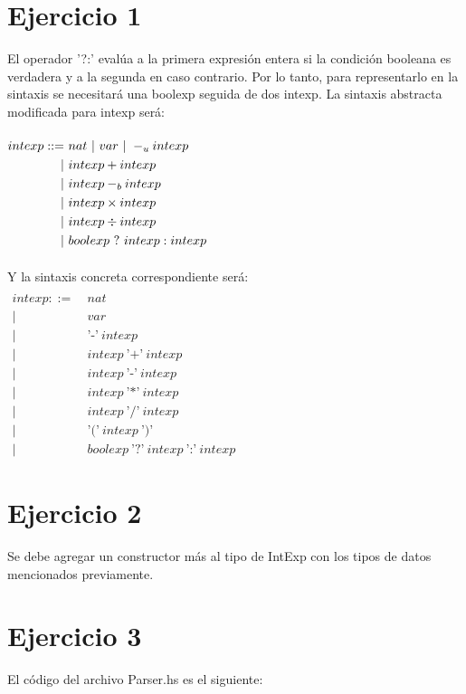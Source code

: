 \documentclass{article}
\begin{document}
	\section*{Ejercicio 1}
	El operador '?:' evalúa a la primera expresión entera si la condición booleana es verdadera
	y a la segunda en caso contrario. Por lo tanto, para representarlo en la sintaxis se necesitará 
	una boolexp seguida de dos intexp. La sintaxis abstracta modificada para intexp será: \\
\\
	$\begin{aligned}
		intexp ::=\ &nat\ |\ var\ |\ -_{u} intexp\\
		|\ &intexp + intexp\\
		|\ &intexp -_{b} intexp\\
		|\ &intexp \times intexp\\
		|\ &intexp \div intexp\\
		|\ &boolexp\ ?\ intexp : intexp
	\end{aligned}\\$
\\
\\
	Y la sintaxis concreta correspondiente será:\\
	$\begin{aligned}
\\	intexp ::=\ &nat\\
	|\ &var\\
	|\ &\text{'-'}\ intexp\\
	|\ &intexp\ \text{'+'}\ intexp\\
	|\ &intexp\ \text{'-'}\ intexp\\
	|\ &intexp\ \text{'*'}\ intexp\\
	|\ &intexp\ \text{'/'}\  intexp\\
	|\ &\text{'('}\ intexp\ \text{')'}\\
	|\ &boolexp\ \text{'?'}\ intexp\ \text{':'}\ intexp
	\end{aligned}$
	\section*{Ejercicio 2}
	Se debe agregar un constructor más al tipo de IntExp con los tipos de datos mencionados previamente.
	
	\newpage
	\section*{Ejercicio 3}
	El código del archivo Parser.hs es el siguiente:
	
	
\end{document}
